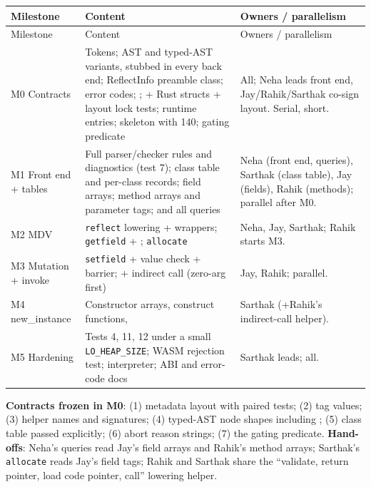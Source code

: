 \documentclass[10pt]{article}
\newcommand{\code}[1]{\texttt{\small #1}}
\begin{document}
\begin{xltabular}{\linewidth}{@{}L{2.4cm}Y L{3.4cm}@{}}
\toprule
Milestone & Content & Owners / parallelism \\
\midrule
\endfirsthead
\toprule Milestone & Content & Owners / parallelism \\ \midrule
\endhead
M0 Contracts & Tokens; AST and typed-AST variants, stubbed in every back end; ReflectInfo preamble class; error codes; ;  + Rust structs + layout lock tests; runtime entries;  skeleton with 140; gating predicate & All; Neha leads front end, Jay/Rahik/Sarthak co-sign layout. Serial, short. \\
M1 Front end + tables & Full parser/checker rules and diagnostics (test 7); class table and per-class records; field arrays; method arrays and parameter tags;  and all queries & Neha (front end, queries), Sarthak (class table), Jay (fields), Rahik (methods); parallel after M0. \\
M2 MDV & \code{reflect} lowering + wrappers; \code{getfield} + ; \code{allocate} & Neha, Jay, Sarthak; Rahik starts M3. \\
M3 Mutation + invoke & \code{setfield} + value check + barrier;  + indirect call (zero-arg first) & Jay, Rahik; parallel. \\
M4 new\_instance & Constructor arrays, construct functions,  & Sarthak (+Rahik's indirect-call helper). \\
M5 Hardening & Tests 4, 11, 12 under a small \code{LO\_HEAP\_SIZE}; WASM rejection test; interpreter; ABI and error-code docs & Sarthak leads; all. \\
\bottomrule
\end{xltabular}

\textbf{Contracts frozen in M0}: (1) metadata layout with paired tests; (2) tag values; (3) helper names and signatures; (4) typed-AST node shapes including ; (5) class table passed explicitly; (6) abort reason strings; (7) the gating predicate. \textbf{Hand-offs}: Neha's queries read Jay's field arrays and Rahik's method arrays; Sarthak's \code{allocate} reads Jay's field tags; Rahik and Sarthak share the ``validate, return pointer, load code pointer, call'' lowering helper.
\end{document}
